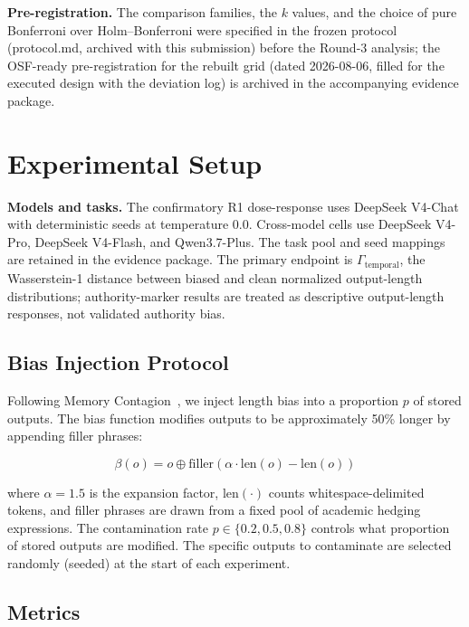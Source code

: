 \documentclass[11pt]{article}
\begin{document}
\textbf{Pre-registration.} The comparison families, the $k$ values, and the choice of pure Bonferroni over Holm--Bonferroni were specified in the frozen protocol (protocol.md, archived with this submission) before the Round-3 analysis; the OSF-ready pre-registration for the rebuilt grid (dated 2026-08-06, filled for the executed design with the deviation log) is archived in the accompanying evidence package.


\section{Experimental Setup}
\label{sec:experimental-setup}

\textbf{Models and tasks.} The confirmatory R1 dose-response uses DeepSeek V4-Chat with deterministic seeds at temperature $0.0$. Cross-model cells use DeepSeek V4-Pro, DeepSeek V4-Flash, and Qwen3.7-Plus. The task pool and seed mappings are retained in the evidence package. The primary endpoint is $\Gamma_{\text{temporal}}$, the Wasserstein-1 distance between biased and clean normalized output-length distributions; authority-marker results are treated as descriptive output-length responses, not validated authority bias.

\subsection{Bias Injection Protocol}

Following Memory Contagion~\cite{memorycontagion2026}, we inject length bias into a proportion $p$ of stored outputs. The bias function modifies outputs to be approximately 50\% longer by appending filler phrases:

\begin{equation}
\beta(o) = o \oplus \text{filler}(\alpha \cdot \text{len}(o) - \text{len}(o))
\end{equation}

where $\alpha = 1.5$ is the expansion factor, $\text{len}(\cdot)$ counts whitespace-delimited tokens, and filler phrases are drawn from a fixed pool of academic hedging expressions. The contamination rate $p \in \{0.2, 0.5, 0.8\}$ controls what proportion of stored outputs are modified. The specific outputs to contaminate are selected randomly (seeded) at the start of each experiment.

\subsection{Metrics}
\end{document}
